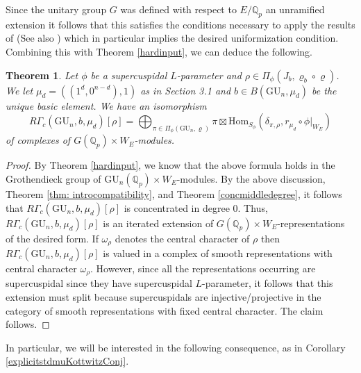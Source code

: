 \documentclass[reqno,11pt]{amsart}
\newtheorem{theorem}{Theorem}[section]
\theoremstyle{remark}
\newcommand{\GU}{\mathrm{GU}}
\begin{document}
Since the unitary group $G$ was defined with respect to $E/\mathbb{Q}_{p}$ an unramified extension it follows that this satisfies the conditions necessary to apply the results of \cite[Section~6]{RZ} (See also \cite[Theorem~3.4]{Han}) which in particular implies the desired uniformization condition. Combining this with Theorem \ref{hardinput}, we can deduce the following. 
\begin{theorem}
Let $\phi$ be a supercuspidal $L$-parameter and $\rho \in \Pi_{\phi}(J_b, \varrho_{b} \circ \varrho)$. We let $\mu_{d} = ((1^{d},0^{n - d}),1)$ as in Section 3.1 and $b \in B(\GU_{n},\mu_{d})$ be the unique basic element. We have an isomorphism 
\[ R\Gamma_{c}(\GU_n,b,\mu_{d})[\rho] = \bigoplus_{\pi \in \Pi_{\phi}(\GU_n, \varrho)} \pi \boxtimes \mathrm{Hom}_{S_{\phi}}(\delta_{\pi,\rho},r_{\mu_{d}}\circ \phi|_{W_{E}}) \]
of complexes of $G(\mathbb{Q}_{p}) \times W_{E}$-modules.
\end{theorem} 
\begin{proof}
By Theorem \ref{hardinput}, we know that the above formula holds in the Grothendieck group of $\GU_{n}(\mathbb{Q}_{p}) \times W_{E}$-modules. By the above discussion, Theorem \ref{thm: introcompatibility}, and Theorem \ref{concmiddledegree}, it follows that $R\Gamma_{c}(\GU_n,b,\mu_{d})[\rho]$ is concentrated in degree $0$. Thus, $R\Gamma_{c}(\GU_n,b,\mu_{d})[\rho]$ is an iterated extension of $G(\mathbb{Q}_{p}) \times W_{E}$-representations of the desired form. If $\omega_{\rho}$ denotes the central character of $\rho$ then $R\Gamma_{c}(\GU_{n},b,\mu_{d})[\rho]$ is valued in a complex of smooth representations with central character $\omega_{\rho}$. However, since all the representations occurring are supercuspidal since they have supercuspidal $L$-parameter, it follows that this extension must split because supercuspidals are injective/projective in the category of smooth representations with fixed central character. The claim follows.
\end{proof}
In particular, we will be interested in the following consequence, as in Corollary \ref{explicitstdmuKottwitzConj}. 
\end{document}
